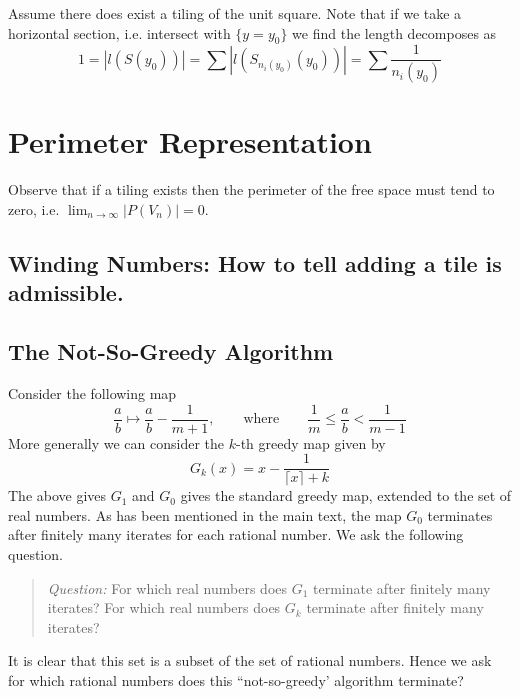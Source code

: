 \documentclass[11pt]{article}
\theoremstyle{plain}%
\theoremstyle{definition}
\theoremstyle{remark}
\numberwithin{equation}{section}
\begin{document}
Assume there does exist a tiling of the unit square. 
Note that if we take a horizontal section, i.e. intersect with $\{y=y_0\}$ we find the length decomposes as
\begin{equation}
1=|l(S(y_0))|=\sum |l(S_{n_i(y_0)}(y_0))|=\sum\frac{1}{n_i(y_0)}
\end{equation}

\section{Perimeter Representation}
Observe that if a tiling exists then the perimeter of the free space must tend to zero, i.e. $\lim_{n\to \infty}|P(V_n)|=0$.

\subsection{Winding Numbers: How to tell adding a tile is admissible.}

\newpage
\begin{appendix}
\section{The Not-So-Greedy Algorithm}
Consider the following map
\begin{equation}
\frac{a}{b}\mapsto \frac{a}{b}-\frac{1}{m+1}, \qquad \mbox{where} \qquad \frac{1}{m}\leq \frac{a}{b}<\frac{1}{m-1}
\end{equation}
More generally we can consider the $k$-th greedy map given by
\begin{equation}
G_k(x)=x-\frac{1}{\lceil x\rceil +k}
\end{equation}
The above gives $G_1$ and $G_0$ gives the standard greedy map, extended to the set of real numbers.
As has been mentioned in the main text, the map $G_0$ terminates after finitely many iterates for each rational number.
We ask the following question.
\begin{quote}
{\it Question: }
For which real numbers does $G_1$ terminate after finitely many iterates?
For which real numbers does $G_k$ terminate after finitely many iterates?
\end{quote}
It is clear that this set is a subset of the set of rational numbers. Hence we ask for which rational numbers does this ``not-so-greedy' algorithm terminate?
\end{appendix}

\small
{}


\end{document}
